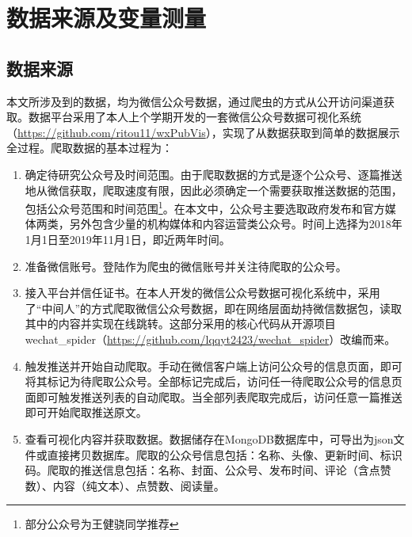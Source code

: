 \documentclass[a4paper,12pt,UTF8]{article}
\begin{document}
    \section{数据来源及变量测量}
    \subsection{数据来源}
    本文所涉及到的数据，均为微信公众号数据，通过爬虫的方式从公开访问渠道获取。数据平台采用了本人上个学期开发的一套微信公众号数据可视化系统（\url{https://github.com/ritou11/wxPubVis}），实现了从数据获取到简单的数据展示全过程。爬取数据的基本过程为：
    \begin{enumerate}
      \item 确定待研究公众号及时间范围。由于爬取数据的方式是逐个公众号、逐篇推送地从微信获取，爬取速度有限，因此必须确定一个需要获取推送数据的范围，包括公众号范围和时间范围\thanks{部分公众号为王健骁同学推荐}。在本文中，公众号主要选取政府发布和官方媒体两类，另外包含少量的机构媒体和内容运营类公众号。时间上选择为2018年1月1日至2019年11月1日，即近两年时间。
      \item 准备微信账号。登陆作为爬虫的微信账号并关注待爬取的公众号。
      \item 接入平台并信任证书。在本人开发的微信公众号数据可视化系统中，采用了“中间人”的方式爬取微信公众号数据，即在网络层面劫持微信数据包，读取其中的内容并实现在线跳转。这部分采用的核心代码从开源项目wechat\_spider（\url{https://github.com/lqqyt2423/wechat_spider}）改编而来。
      \item 触发推送并开始自动爬取。手动在微信客户端上访问公众号的信息页面，即可将其标记为待爬取公众号。全部标记完成后，访问任一待爬取公众号的信息页面即可触发推送列表的自动爬取。当全部列表爬取完成后，访问任意一篇推送即可开始爬取推送原文。
      \item 查看可视化内容并获取数据。数据储存在MongoDB数据库中，可导出为json文件或直接拷贝数据库。爬取的公众号信息包括：名称、头像、更新时间、标识码。爬取的推送信息包括：名称、封面、公众号、发布时间、评论（含点赞数）、内容（纯文本）、点赞数、阅读量。
    \end{enumerate}
\end{document}
